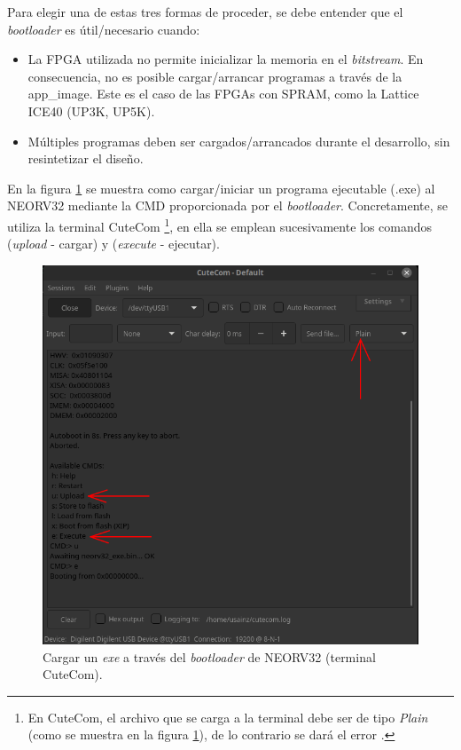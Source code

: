Para elegir una de estas tres formas de proceder, se debe entender que el \textit{bootloader} es útil/necesario cuando:

    \begin{itemize}
        \item La FPGA utilizada no permite inicializar la memoria en el \textit{bitstream}. 
En consecuencia, no es posible cargar/arrancar programas a través de la app\_image.
Este es el caso de las FPGAs con SPRAM, como la Lattice ICE40 (UP3K, UP5K).
        \item Múltiples programas deben ser cargados/arrancados durante el desarrollo, sin resintetizar el diseño.
    \end{itemize} 

En la figura \ref{fig:boot} se muestra como cargar/iniciar un programa ejecutable (.exe) al NEORV32 mediante la CMD proporcionada por el \textit{bootloader}. 
Concretamente, se utiliza la terminal CuteCom \footnote {En CuteCom, el archivo que se carga a la terminal debe ser de tipo \textit{Plain} (como se muestra en la figura \ref{fig:boot}), de lo contrario se dará el error .}, en ella se emplean sucesivamente los comandos  (\textit{upload} - cargar) y  (\textit{execute} - ejecutar).

\begin{figure}[h!]
    \centering
    \includegraphics[width=14cm]{Figuras/cutecom_cmd_upload.png}
    \caption{Cargar un \textit{exe} a través del \textit{bootloader} de NEORV32 (terminal CuteCom).}
    \label{fig:boot}
\end{figure}

